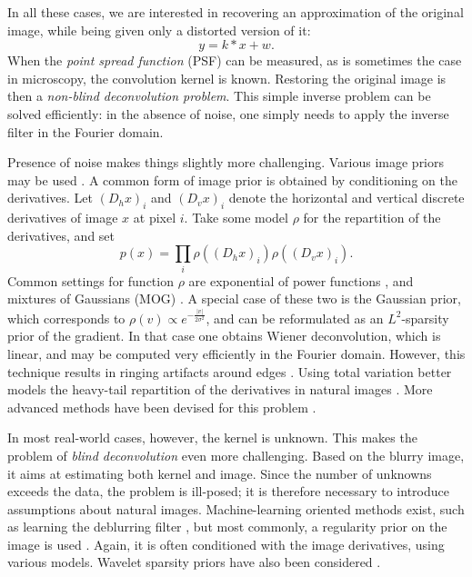 \documentclass[english,a4paper]{article}
\theoremstyle{plain}
\theoremstyle{definition}
\theoremstyle{remark}
\begin{document}
In all these cases, we are interested in recovering an approximation of the original image, while being given only a distorted version of it:
\[
y = k * x + w.
\]
When the \emph{point spread function} (PSF) can be measured, as is sometimes the case in microscopy, the convolution kernel is known.
Restoring the original image is then a \emph{non-blind deconvolution problem}.
This simple inverse problem can be solved efficiently: in the absence of noise, one simply needs to apply the inverse filter in the Fourier domain.

Presence of noise makes things slightly more challenging.
Various image priors may be used \cite{sun2014good}.
A common form of image prior is obtained by conditioning on the derivatives. Let $(D_h x)_i$ and $(D_v x)_i$ denote the horizontal and vertical discrete derivatives of image $x$ at pixel $i$.
Take some model $\rho$ for the repartition of the derivatives, and set
\[
p(x) = \prod_i \rho((D_h x)_i) \rho((D_v x)_i) .
\]
Common settings for function $\rho$ are exponential of power functions \cite{krishnan2009fast,levin2009understanding}, and mixtures of Gaussians (MOG) \cite{levin2011efficient,fergus2006removing}.
A special case of these two is the Gaussian prior, which corresponds to $\rho(v) \propto e^{-\frac{|v|}{2\sigma^2}}$, and can be reformulated as an $L^2$-sparsity prior of the gradient. In that case one obtains Wiener deconvolution, which is linear, and may be computed very efficiently in the Fourier domain. However, this technique results in ringing artifacts around edges \cite{shan2008high}.
Using total variation better models the heavy-tail repartition of the derivatives in natural images \cite{chan1998total,levi2009using}.
More advanced methods have been devised for this problem \cite{sun2014good,schmidt2013discriminative}.



In most real-world cases, however, the kernel is unknown. This makes the problem of \emph{blind deconvolution} even more challenging.
Based on the blurry image, it aims at estimating both kernel and image.
Since the number of unknowns exceeds the data, the problem is ill-posed; it is therefore necessary to introduce assumptions about natural images.
Machine-learning oriented methods exist, such as learning the deblurring filter \cite{bell1995information}, but most commonly, a regularity prior on the image is used \cite{krishnan2009fast,fergus2006removing,levin2007blind,levi2009using,levin2011efficient,levin2009understanding,chan1998total}.
Again, it is often conditioned with the image derivatives, using various models. Wavelet sparsity priors have also been considered \cite{jalobeanu2002satellite}.
\end{document}
